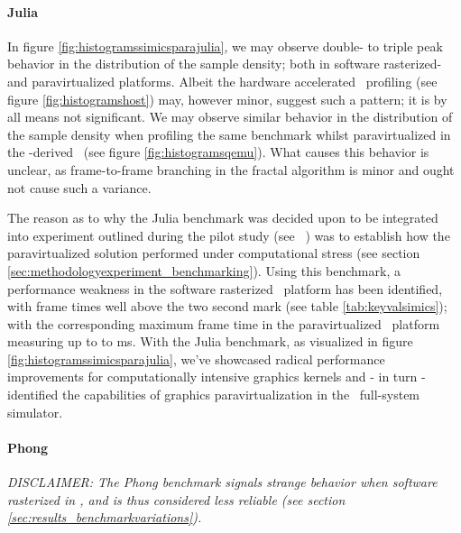 \paragraph{Julia}
\label{par:results_julia}
In figure \ref{fig:histogramssimicsparajulia}, we may observe double- to triple peak behavior in the distribution of the sample density; both in software rasterized- and paravirtualized platforms.
Albeit the hardware accelerated \dvttermhost\ profiling (see figure \ref{fig:histogramshost}) may, however minor, suggest such a pattern; it is by all means not significant.
We may observe similar behavior in the distribution of the sample density when profiling the same benchmark whilst paravirtualized in the \dvttermqemu -derived \dvttermandroidemulator\ (see figure \ref{fig:histogramsqemu}).
What causes this behavior is unclear, as frame-to-frame branching in the fractal algorithm is minor and ought not cause such a variance.

The reason as to why the Julia benchmark was decided upon to be integrated into experiment outlined during the pilot study (see ~) was to establish how the paravirtualized solution performed under computational stress (see section \ref{sec:methodologyexperiment_benchmarking}).
Using this benchmark, a performance weakness in the software rasterized \dvttermsimics\ platform has been identified, with frame times well above the two second mark (see table \ref{tab:keyvalsimics}); with the corresponding maximum frame time in the paravirtualized \dvttermsimics\ platform measuring up to to  ms.
With the Julia benchmark, as visualized in figure \ref{fig:histogramssimicsparajulia}, we've showcased radical performance improvements for computationally intensive graphics kernels and - in turn - identified the capabilities of graphics paravirtualization in the \dvttermsimics\ full-system simulator. %




\paragraph{Phong}
\label{par:results_phong}
\textit{DISCLAIMER: The Phong benchmark signals strange behavior when software rasterized in \dvttermsimics , and is thus considered less reliable (see section \ref{sec:results_benchmarkvariations}).}\\

